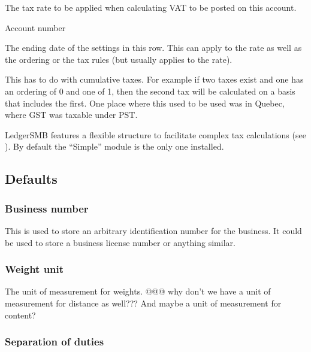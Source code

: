 \begin{description}[style=nextline]
\item [Rate (\%)] The tax rate to be applied when calculating VAT to be posted on this account.
\item [Number] Account number
\item [Valid To] The ending date of the settings in this row. This can apply to the rate as well as the ordering or the tax rules (but usually applies to the rate).
\item [Ordering] This has to do with cumulative taxes.  For example if two taxes
exist and one has an ordering of 0 and one of 1, then the second tax will be
calculated on a basis that includes the first.  One place where this used to be
used was in Quebec, where GST was taxable under PST.
\item [Tax rules] LedgerSMB features a flexible structure to facilitate complex tax
calculations (see ). By default the ``Simple'' module
is the only one installed.
\end{description}

\subsection{Defaults}
\label{subsec-company-config-defaults}

\subsubsection{Business number}
\label{subsubsec-company-config-defaults-business-number}
   This is used to store an arbitrary identification number for the business.  It
could be used to store a business license number or anything similar.
   
\subsubsection{Weight unit}
\label{subsubsec-company-config-defaults-weight-unit}
   The unit of measurement for weights. @@@ why don't we have a unit of measurement for distance as well??? And maybe a unit of measurement for content?
   
\subsubsection{Separation of duties}
\label{subsubsec-company-config-defaults-separation-of-duties}



